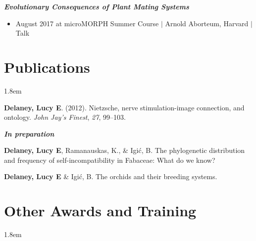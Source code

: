 \documentclass[]{article}
\newlength{\cslhangindent}
\newenvironment{cslreferences}
{\setlength{\parindent}{0pt}
\everypar{\setlength{\hangindent}{\cslhangindent}}\ignorespaces}
{\par}
\begin{document}
\textit{\textbf{Evolutionary Consequences of Plant Mating Systems}}

\begin{itemize}[label=$\mathwitch*$]
\item{August 2017 at microMORPH Summer Course $\vert$ Arnold Aborteum, Harvard $\vert$ Talk \hspace{0.3mm} \href{https://www.dropbox.com/s/o7hcg5riw97wf9i/08-2017-microMORPH.pdf?dl=1}{\faImages}}
\end{itemize}
\vspace{2mm}

\section{Publications}

\vspace{4mm}
\leftskip 1.8em

\begin{cslreferences}
\textbf{Delaney, Lucy E}. (2012). Nietzsche, nerve stimulation-image connection, and ontology. \emph{John Jay's Finest}, \emph{27}, 99--103. \href{https://ledelaney.org/static/docs/Delaney-JJAYFinest.pdf}{\faFile}\\
\end{cslreferences}

\textbf{\textit{In preparation}}
\vspace{2mm}

\begin{cslreferences}
\textbf{Delaney, Lucy E}, Ramanauskas, K., \& Igić, B. The phylogenetic distribution and frequency of self-incompatibility in Fabaceae: What do we know?

\textbf{Delaney, Lucy E} \& Igić, B. The orchids and their breeding systems.\\
\end{cslreferences}

\section{Other Awards and Training}

\vspace{4mm}
\leftskip 1.8em
\end{document}
